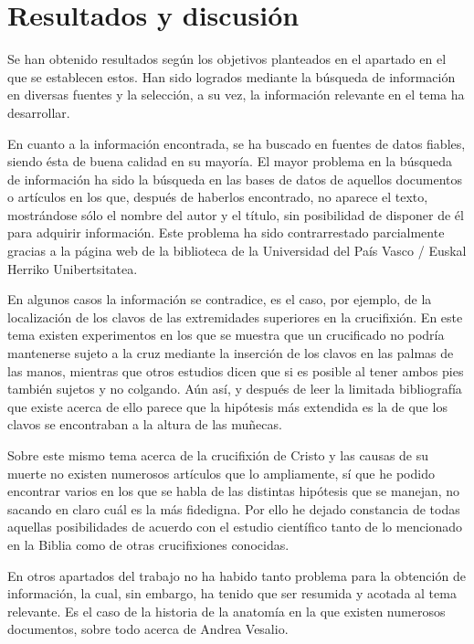 \section{Resultados y discusión}

Se han obtenido resultados según los objetivos planteados en el apartado en el que se establecen estos. Han sido logrados mediante la búsqueda de información en diversas fuentes y la selección, a su vez, la información relevante en el tema ha desarrollar.

En cuanto a la información encontrada, se ha buscado en fuentes de datos fiables, siendo ésta de buena calidad en su mayoría. El mayor problema en la búsqueda de información ha sido la búsqueda en las bases de datos de aquellos documentos o artículos en los que, después de haberlos encontrado, no aparece el texto, mostrándose sólo el nombre del autor y el título, sin posibilidad de disponer de él para adquirir información. Este problema ha sido contrarrestado parcialmente gracias a la página web de la biblioteca de la Universidad del País Vasco / Euskal Herriko Unibertsitatea.

En algunos casos la información se contradice, es el caso, por ejemplo, de la localización de los clavos de las extremidades superiores en la crucifixión. En este tema existen experimentos en los que se muestra que un crucificado no podría mantenerse sujeto a la cruz mediante la inserción de los clavos en las palmas de las manos, mientras que otros estudios dicen que si es posible al tener ambos pies también sujetos y no colgando. Aún así, y después de leer la limitada bibliografía que existe acerca de ello parece que la hipótesis más extendida es la de que los clavos se encontraban a la altura de las muñecas.

Sobre este mismo tema acerca de la crucifixión de Cristo y las causas de su muerte no existen numerosos artículos que lo ampliamente, sí que he podido encontrar varios en los que se habla de las distintas hipótesis que se manejan, no sacando en claro cuál es la más fidedigna. Por ello he dejado constancia de todas aquellas posibilidades de acuerdo con el estudio científico tanto de lo mencionado en la Biblia como de otras crucifixiones conocidas.

En otros apartados del trabajo no ha habido tanto problema para la obtención de información, la cual, sin embargo, ha tenido que ser resumida y acotada al tema relevante. Es el caso de la historia de la anatomía en la que existen numerosos documentos, sobre todo acerca de Andrea Vesalio.

